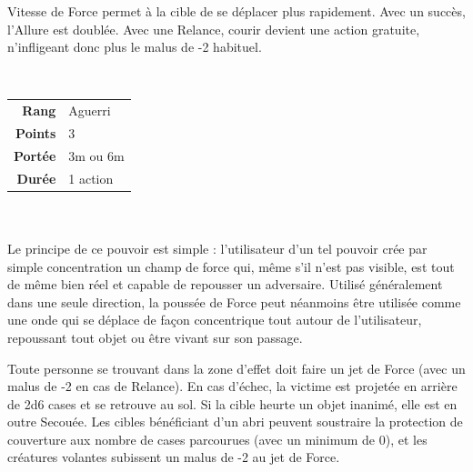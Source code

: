 \begin{description}[align=left]
        Vitesse de Force permet à la cible de se déplacer plus rapidement. Avec un succès, l’Allure est doublée. Avec une Relance, courir devient une action gratuite, n’infligeant donc plus le malus de -2 habituel. 
        \\

    \item [Poussée de Force] ~ \\

        \begin{tabular}{ r l }
            \textbf{Rang}    & Aguerri \\
            \textbf{Points}  & 3 \\
            \textbf{Portée}  & 3m ou 6m \\
            \textbf{Durée}   & 1 action \\
        \end{tabular}
        \\ \\
        Le principe de ce pouvoir est simple : l'utilisateur d'un tel pouvoir crée par simple concentration un champ de force qui, même s'il n'est pas visible, est tout de même bien réel et capable de repousser un adversaire. Utilisé généralement dans une seule direction, la poussée de Force peut néanmoins être utilisée comme une onde qui se déplace de façon concentrique tout autour de l'utilisateur, repoussant tout objet ou être vivant sur son passage. 

        Toute personne se trouvant dans la zone d’effet doit faire un jet de Force (avec un malus de -2 en cas de Relance). En cas d’échec, la victime est projetée en arrière de 2d6 cases et se retrouve au sol. Si la cible heurte un objet inanimé, elle est en outre Secouée. Les cibles bénéficiant d’un abri peuvent soustraire la protection de couverture aux nombre de cases parcourues (avec un minimum de 0), et les créatures volantes subissent un malus de -2 au jet de Force.
        \\

\end{description}

